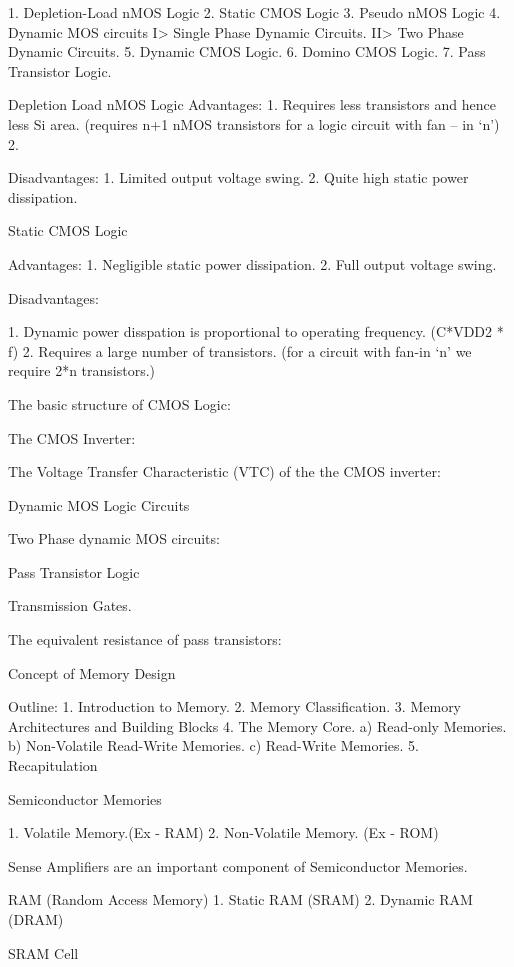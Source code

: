 1. Depletion-Load nMOS Logic
2. Static CMOS Logic
3. Pseudo nMOS Logic
4. Dynamic MOS circuits
    I> Single Phase Dynamic Circuits.
    II> Two Phase Dynamic Circuits.
5. Dynamic CMOS Logic.
6. Domino CMOS Logic.
7. Pass Transistor Logic.


							Depletion Load nMOS Logic
Advantages:
1. Requires less transistors and hence less Si area. (requires n+1 nMOS transistors for a logic circuit with fan – in ‘n’)
2.


Disadvantages:
1. Limited output voltage swing.
2. Quite high static power dissipation.


							Static CMOS Logic

Advantages:
1. Negligible static power dissipation.
2. Full output voltage swing.

Disadvantages:

1. Dynamic power disspation is proportional to operating frequency. (C*VDD2 * f)
2. Requires a large number of transistors. (for a circuit with fan-in ‘n’ we require 2*n transistors.)


The basic structure of CMOS Logic:



The CMOS Inverter:

The Voltage Transfer Characteristic (VTC) of the the CMOS inverter:





						  Dynamic MOS Logic Circuits

Two Phase dynamic MOS circuits:


 






							







							Pass Transistor Logic


Transmission Gates.


The equivalent resistance of pass transistors:





							Concept of Memory Design

Outline:
1. Introduction to Memory.
2. Memory Classification.
3. Memory Architectures and Building Blocks
4. The Memory Core.
a)	Read-only Memories.
b)	Non-Volatile Read-Write Memories.
c) 	Read-Write Memories.
5. Recapitulation


Semiconductor Memories

1. Volatile Memory.(Ex - RAM)
2. Non-Volatile Memory. (Ex - ROM)

Sense Amplifiers are an important component of Semiconductor Memories.

				RAM (Random Access Memory)
1. Static RAM (SRAM)
2. Dynamic RAM (DRAM)

SRAM Cell


 










